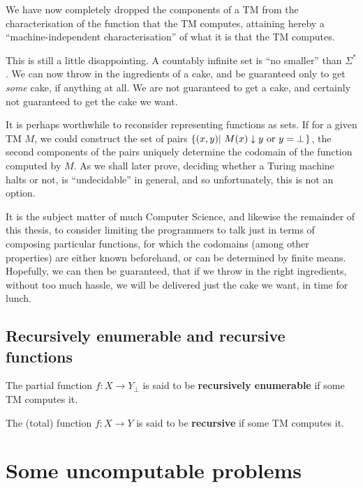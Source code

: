 \begin{remark} We have now completely dropped the components of a TM from the
characterisation of the function that the TM computes, attaining hereby a
``machine-independent characterisation'' of what it is that the TM computes.
\end{remark}

This is still a little disappointing. A countably infinite set is ``no
smaller'' than $\Sigma^*$. We can now throw in the ingredients of a cake, and
be guaranteed only to get \emph{some} cake, if anything at all. We are not
guaranteed to get a cake, and certainly not guaranteed to get the cake we want.

It is perhaps worthwhile to reconsider representing functions as sets. If for a
given TM $M$, we could construct the set of pairs
$\mathopen{}\left\{{\mathopen{}\left({x,y}\right)\mathclose{}\mathopen{}\left|\ {\text{$M\mathopen{}\left({x}\right)\mathclose{}\downarrow y$ or $y=\bot$}}\right.\mathclose{}}\right\}\mathclose{}$, the second
components of the pairs uniquely determine the codomain of the function
computed by $M$. As we shall later prove, deciding whether a Turing machine
halts or not, is ``undecidable'' in general, and so unfortunately, this is not
an option.

It is the subject matter of much Computer Science, and likewise the remainder
of this thesis, to consider limiting the programmers to talk just in terms of
composing particular functions, for which the codomains (among other
properties) are either known beforehand, or can be determined by finite means.
Hopefully, we can then be guaranteed, that if we throw in the right
ingredients, without too much hassle, we will be delivered just the cake we
want, in time for lunch.

\subsection{Recursively enumerable and recursive functions}

\begin{definition} The partial function $f:X\rightarrow Y_\bot$ is said to be
\textbf{recursively enumerable} if some TM computes it. \end{definition}

\begin{definition} The (total) function $f:X\rightarrow Y$ is said to be
\textbf{recursive} if some TM computes it. \end{definition}

\section{Some uncomputable problems}

